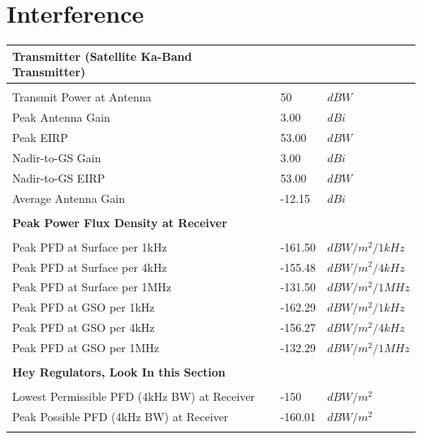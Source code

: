 \documentclass{article}
\begin{document}
\section{Interference}
\label{section::interference}
\begin{center}
  \begin{tabular}{p{3in}p{1in}l}
\textbf{Transmitter (Satellite Ka-Band Transmitter)} & & \\
\hline \\
Transmit Power at Antenna & 50 & $dBW$ \\
Peak Antenna Gain & 3.00 & $dBi$ \\
Peak EIRP & 53.00 & $dBW$ \\
Nadir-to-GS Gain & 3.00 & $dBi$ \\
Nadir-to-GS EIRP & 53.00 & $dBW$ \\
Average Antenna Gain & -12.15 & $dBi$ \\
\\
\textbf{Peak Power Flux Density at Receiver} & & \\
\hline \\
Peak PFD at Surface per 1kHz & -161.50 & $dBW/m^2/1kHz$ \\
Peak PFD at Surface per 4kHz & -155.48 & $dBW/m^2/4kHz$ \\
Peak PFD at Surface per 1MHz & -131.50 & $dBW/m^2/1MHz$ \\
Peak PFD at GSO per 1kHz & -162.29 & $dBW/m^2/1kHz$ \\
Peak PFD at GSO per 4kHz & -156.27 & $dBW/m^2/4kHz$ \\
Peak PFD at GSO per 1MHz & -132.29 & $dBW/m^2/1MHz$ \\
\\
\textbf{Hey Regulators, Look In this Section} & & \\
\hline \\
Lowest Permissible PFD (4kHz BW) at Receiver & -150 & $dBW/m^2$ \\
Peak Possible PFD (4kHz BW) at Receiver & -160.01 & $dBW/m^2$ \\
\\
\end{tabular}

  
\end{center}


\newpage
\end{document}
